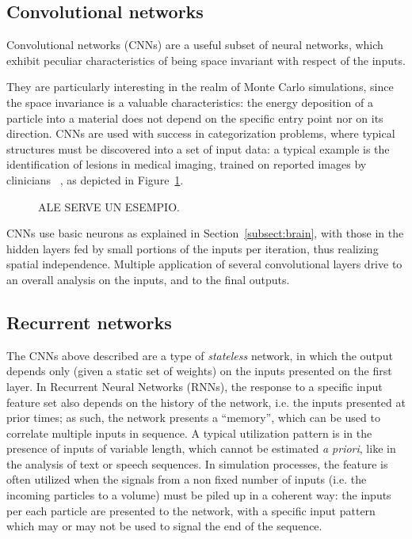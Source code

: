 \subsection{Convolutional networks}
Convolutional networks (CNNs) are a useful subset of neural networks, which exhibit peculiar characteristics of being space invariant with respect of the inputs.

They are particularly interesting in the realm of Monte Carlo simulations, since the space invariance is a valuable characteristics:  
the energy deposition of a particle into a material
does not depend on the specific entry point nor on its direction.
CNNs are used with success in categorization problems, where typical structures must be discovered into a set of input data: a typical example is the identification of lesions in medical imaging, trained on reported images by clinicians ~\cite{cnnmedical}, as depicted in Figure~\ref{fig:cnnsmedical}.

 \begin{figure}[h]
    \centering
    \hfill
     \caption{ALE SERVE UN ESEMPIO.}
     \label{fig:cnnsmedical}
\end{figure}

CNNs use basic neurons as explained in Section~\ref{subsect:brain}, with those in the hidden layers fed by small portions of the inputs per iteration, thus realizing spatial independence. Multiple application of several convolutional layers drive to an overall analysis on the inputs, and to the final outputs.

\subsection{Recurrent networks}
The CNNs above described are a type of \emph{stateless} network, in which the output depends only (given a static set of weights) on the inputs presented on the first layer. In Recurrent Neural Networks (RNNs), the response to a specific input feature set also depends on the history of the network, i.e. the inputs presented at prior times; as such, the network presents a ``memory'', which can be used to correlate multiple inputs in sequence. A typical utilization pattern is in the presence of inputs of variable length, which cannot be estimated \emph{a priori}, like in the analysis of text or speech sequences. 
In simulation processes, the feature is often utilized when the signals from a non fixed number of inputs (i.e. the incoming particles to a volume) must be piled up in a coherent way: the inputs per each particle are presented to the network, with a specific input pattern which may or may not be used to signal the end of the sequence. %

